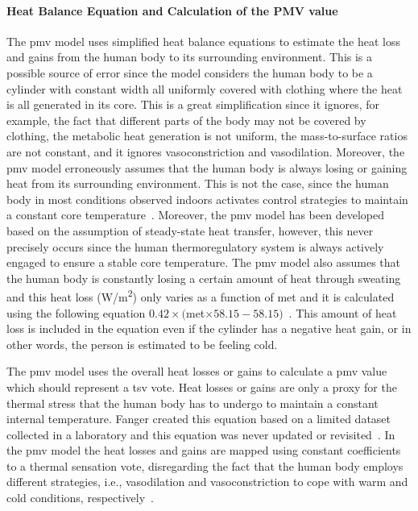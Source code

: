 \paragraph{Heat Balance Equation and Calculation of the PMV value}
The \ac{pmv} model uses simplified heat balance equations to estimate the heat loss and gains from the human body to its surrounding environment.
This is a possible source of error since the model considers the human body to be a cylinder with constant width all uniformly covered with clothing where the heat is all generated in its core.
This is a great simplification since it ignores, for example, the fact that different parts of the body may not be covered by clothing, the metabolic heat generation is not uniform, the mass-to-surface ratios are not constant, and it ignores vasoconstriction and vasodilation.
Moreover, the \ac{pmv} model erroneously assumes that the human body is always losing or gaining heat from its surrounding environment.
This is not the case, since the human body in most conditions observed indoors activates control strategies to maintain a constant core temperature~\cite{romanovsky_thermoregulation_2018}.
Moreover, the \ac{pmv} model has been developed based on the assumption of steady-state heat transfer, however, this never precisely occurs since the human thermoregulatory system is always actively engaged to ensure a stable core temperature.
The \ac{pmv} model also assumes that the human body is constantly losing a certain amount of heat through sweating and this heat loss (W/m\textsuperscript{2}) only varies as a function of \ac{met} and it is calculated using the following equation $0.42\times($\ac{met}$\times58.15 - 58.15)$~\cite{Fanger1970}.
This amount of heat loss is included in the equation even if the cylinder has a negative heat gain, or in other words, the person is estimated to be feeling cold.

The \ac{pmv} model uses the overall heat losses or gains to calculate a \ac{pmv} value which should represent a \ac{tsv} vote.
Heat losses or gains are only a proxy for the thermal stress that the human body has to undergo to maintain a constant internal temperature.
Fanger created this equation based on a limited dataset collected in a laboratory and this equation was never updated or revisited~\cite{Fanger1970}.
In the \ac{pmv} model the heat losses and gains are mapped using constant coefficients to a thermal sensation vote, disregarding the fact that the human body employs different strategies, i.e., vasodilation and vasoconstriction to cope with warm and cold conditions, respectively~\cite{romanovsky_thermoregulation_2018}.

